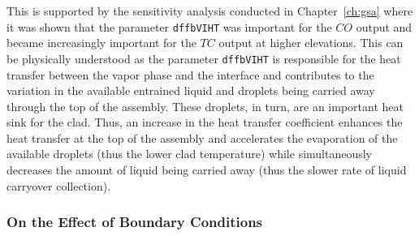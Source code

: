 This is supported by the sensitivity analysis conducted in Chapter~\ref{ch:gsa} where it was shown that the parameter \texttt{dffbVIHT} was important for the $CO$ output and became increasingly important for the $TC$ output at higher elevations.
This can be physically understood as the parameter \texttt{dffbVIHT} is responsible for the heat transfer between the vapor phase and the interface and contributes to the variation in the available entrained liquid and droplets being carried away through the top of the assembly.
These droplets, in turn, are an important heat sink for the clad.
Thus, an increase in the heat transfer coefficient enhances the heat transfer at the top of the assembly and accelerates the evaporation of the available droplets (thus the lower clad temperature) while simultaneously decreases the amount of liquid being carried away (thus the slower rate of liquid carryover collection).

\subsubsection{On the Effect of Boundary Conditions}\label{subsub:bc_discussion_boundary_conditions}

